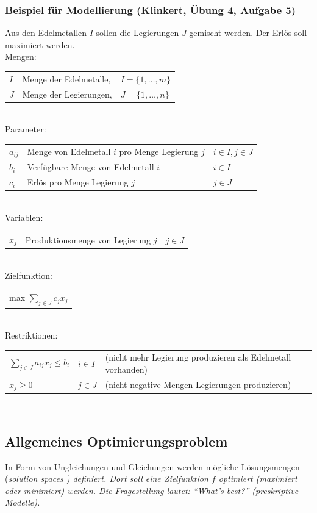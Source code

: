   \subsubsection{Beispiel für Modellierung (Klinkert, Übung 4, Aufgabe 5)}
  Aus den Edelmetallen $I$ sollen die Legierungen $J$ gemischt werden. Der Erlös soll maximiert werden.\\
  Mengen:\\
  \begin{tabular}{lll}
    $I$ & Menge der Edelmetalle, &$I = \{1, \ldots, m\}$\\
    $J$ & Menge der Legierungen, &$J = \{1, \ldots, n\}$
  \end{tabular}\\
  Parameter:\\
  \begin{tabular}{lll}
    $a_{ij}$ & Menge von Edelmetall $i$ pro Menge Legierung $j$ & $i \in I, j \in J$\\
    $b_i$    & Verfügbare Menge von Edelmetall $i$              & $i \in I$\\
    $c_i$    & Erlös pro Menge Legierung $j$                    & $j \in J$\\
  \end{tabular}\\
  Variablen:\\
  \begin{tabular}{lll}
    $x_j$ & Produktionsmenge von Legierung $j$ & $j \in J$\\
  \end{tabular}\\
  Zielfunktion:\\
  \begin{tabular}{l}
    max $\sum_{j \in J}c_j x_j$\\
  \end{tabular}\\
  Restriktionen:\\
  \begin{tabular}{lll}
    $\sum_{j \in J}a_{ij}x_j \le b_i$ & $i \in I$ & (nicht mehr Legierung produzieren als Edelmetall vorhanden)\\
    $x_j \ge 0$                       & $j \in J$ & (nicht negative Mengen Legierungen produzieren)
  \end{tabular}\\




\subsection{Allgemeines Optimierungsproblem }
  In Form von Ungleichungen und Gleichungen werden mögliche Lösungsmengen (\em solution spaces \em) definiert. Dort soll eine Zielfunktion $f$ optimiert (maximiert oder minimiert) werden. Die Fragestellung lautet: "`What's best?"' (preskriptive Modelle).
  
